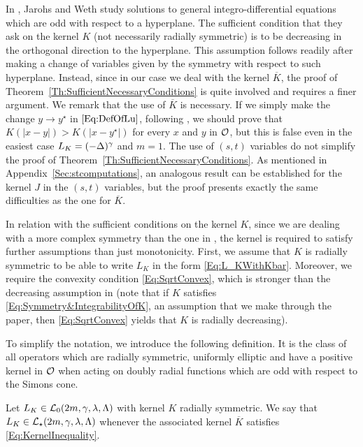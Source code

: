 In \cite{JarohsWeth}, Jarohs and Weth study solutions to general integro-differential equations which are odd with respect to a hyperplane. The sufficient condition that they ask on the kernel $K$ (not necessarily radially symmetric) is to be decreasing in the orthogonal direction to the hyperplane. This assumption follows readily after making a change of variables given by the symmetry with respect to such hyperplane. Instead, since in our case we deal with the kernel $\overline{K}$, the proof of Theorem~\ref{Th:SufficientNecessaryConditions} is quite involved and requires a finer argument. We remark that the use of $\overline{K}$ is necessary. If we simply make the change $y \to y^\star$ in $\eqref{Eq:DefOfLu}$, following \cite{JarohsWeth}, we should prove that $K(|x-y|) > K(|x-y^\star|)$ for every $x$ and $y$ in $\mathcal{O}$, but this is false even in the easiest case $L_K = (-\Delta)^\gamma$ and $m=1$. The use of $(s,t)$ variables do not simplify the proof of Theorem~\ref{Th:SufficientNecessaryConditions}. As mentioned in Appendix~\ref{Sec:stcomputations}, an analogous result can be established for the kernel $J$ in the $(s,t)$ variables, but the proof presents exactly the same difficulties as the one for $\overline{K}$.


In relation with the sufficient conditions on the kernel $K$, since we are dealing with a more complex symmetry than the one in \cite{JarohsWeth}, the kernel is required to satisfy further assumptions than just monotonicity. First, we assume that $K$ is radially symmetric to be able to write $L_K$ in the form \eqref{Eq:L_KWithKbar}. Moreover, we require the convexity condition \eqref{Eq:SqrtConvex}, which is stronger than the decreasing assumption in \cite{JarohsWeth} (note that if $K$ satisfies \eqref{Eq:Symmetry&IntegrabilityOfK}, an assumption that we make through the paper, then \eqref{Eq:SqrtConvex} yields that $K$ is radially decreasing). 

To simplify the notation, we introduce the following definition. It is the class of all operators which are radially symmetric, uniformly elliptic and have a positive kernel in $\mathcal{O}$ when acting on doubly radial functions which are odd with respect to the Simons cone.

\begin{definition}
	Let $L_K \in \mathcal{L}_0(2m,\gamma,\lambda, \Lambda)$ with kernel $K$ radially symmetric. We say that $L_K\in \mathcal{L}_\star (2m,\gamma,\lambda, \Lambda)$ whenever the associated kernel $\overline{K}$ satisfies \eqref{Eq:KernelInequality}.
\end{definition}

